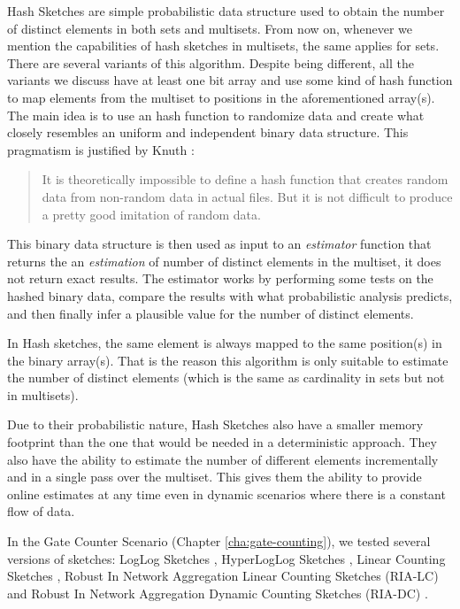 Hash Sketches are simple probabilistic data structure used to obtain
the number of distinct elements in both sets and multisets. From now
on, whenever we mention the capabilities of hash sketches in
multisets, the same applies for sets. There are several variants of
this algorithm. Despite being different, all the variants we discuss
have at least one bit array and use some kind of hash function to map
elements from the multiset to positions in the aforementioned
array(s). The main idea is to use an hash function to randomize data
and create what closely resembles an uniform and independent binary
data structure. This pragmatism is justified by Knuth
\cite{knuth1998art}:
\begin{quotation}
It is theoretically impossible to define a hash
function that creates random data from non-random data in actual
files. But it is not difficult to produce a pretty good imitation of
random data.  
\end{quotation}
This binary data structure is then used as input to an
\emph{estimator} function that returns the an \emph{estimation} of
number of distinct elements in the multiset, it does not return exact
results. The estimator works by performing some tests on the hashed
binary data, compare the results with what probabilistic analysis
predicts, and then finally infer a plausible value for the number of
distinct elements.

In Hash sketches, the same element is always mapped to the same
position(s) in the binary array(s). That is the reason this algorithm
is only suitable to estimate the number of distinct elements (which
is the same as cardinality in sets but not in multisets).

Due to their probabilistic nature, Hash Sketches also have a smaller
memory footprint than the one that would be needed in a deterministic
approach. They also have the ability to estimate
the number of different elements incrementally and in a single pass
over the multiset. This gives them the ability to provide online
estimates at any time even in dynamic scenarios where there is a
constant flow of data. 

In the Gate Counter Scenario (Chapter \ref{cha:gate-counting}), we
tested several versions of sketches: LogLog Sketches
\cite{Durand:2003tc}, HyperLogLog Sketches \cite{Fusy:2007um}, Linear
Counting Sketches \cite{Whang:1990uh}, Robust In Network Aggregation
Linear Counting Sketches (RIA-LC)
\cite{Fan:2008wl,YaoChungFanArbeeLPChen:2010to} and Robust In Network
Aggregation Dynamic Counting Sketches (RIA-DC)
\cite{YaoChungFanArbeeLPChen:2010to}.

